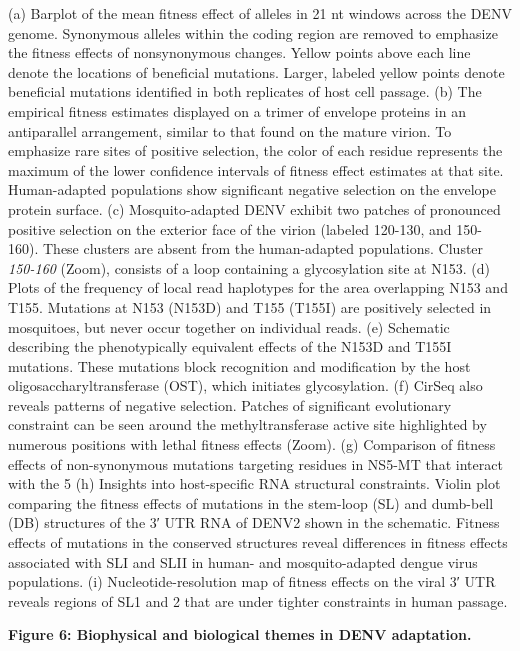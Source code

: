 \documentclass[
]{article}
\begin{document}
(a) Barplot of the mean fitness effect of alleles in 21 nt windows
across the DENV genome. Synonymous alleles within the coding region are
removed to emphasize the fitness effects of nonsynonymous changes.
Yellow points above each line denote the locations of beneficial
mutations. Larger, labeled yellow points denote beneficial mutations
identified in both replicates of host cell passage. (b) The empirical
fitness estimates displayed on a trimer of envelope proteins in an
antiparallel arrangement, similar to that found on the mature virion. To
emphasize rare sites of positive selection, the color of each residue
represents the maximum of the lower confidence intervals of fitness
effect estimates at that site. Human-adapted populations show
significant negative selection on the envelope protein surface. (c)
Mosquito-adapted DENV exhibit two patches of pronounced positive
selection on the exterior face of the virion (labeled 120-130, and
150-160). These clusters are absent from the human-adapted populations.
Cluster \emph{150-160} (Zoom), consists of a loop containing a
glycosylation site at N153. (d) Plots of the frequency of local read
haplotypes for the area overlapping N153 and T155. Mutations at N153
(N153D) and T155 (T155I) are positively selected in mosquitoes, but
never occur together on individual reads. (e) Schematic describing the
phenotypically equivalent effects of the N153D and T155I mutations.
These mutations block recognition and modification by the host
oligosaccharyltransferase (OST), which initiates glycosylation. (f)
CirSeq also reveals patterns of negative selection. Patches of
significant evolutionary constraint can be seen around the
methyltransferase active site highlighted by numerous positions with
lethal fitness effects (Zoom). (g) Comparison of fitness effects of
non-synonymous mutations targeting residues in NS5-MT that interact with
the 5 (h) Insights into host-specific RNA structural constraints. Violin
plot comparing the fitness effects of mutations in the stem-loop (SL)
and dumb-bell (DB) structures of the 3′ UTR RNA of DENV2 shown in the
schematic. Fitness effects of mutations in the conserved structures
reveal differences in fitness effects associated with SLI and SLII in
human- and mosquito-adapted dengue virus populations. (i)
Nucleotide-resolution map of fitness effects on the viral 3′ UTR reveals
regions of SL1 and 2 that are under tighter constraints in human
passage.

\textbf{Figure 6: Biophysical and biological themes in DENV adaptation.}
\end{document}
